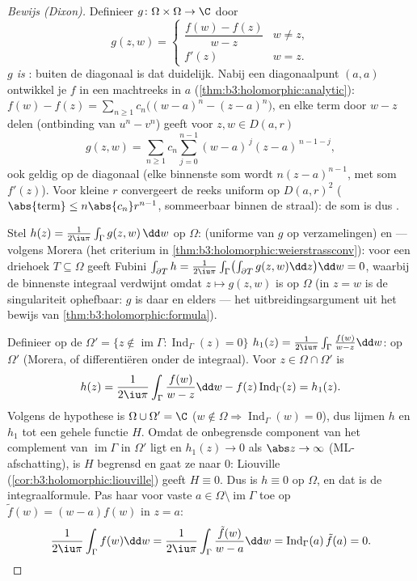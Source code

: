\begin{proof}[Bewijs (Dixon)]
Definieer $g \colon \Omega\times\Omega \to \C$ door
\[
g(z, w) = \begin{cases}
\dfrac{f(w) - f(z)}{w - z} & w \neq z,\\[4pt]
f'(z) & w = z .
\end{cases}
\]
\emph{$g$ is }: buiten de diagonaal is dat duidelijk.
Nabij een diagonaalpunt $(a, a)$ ontwikkel je $f$ in een
machtreeks in $a$ (\cref{thm:b3:holomorphic:analytic}): $f(w) -
f(z) = \sum_{n\geq1}c_n\bigl((w-a)^n - (z-a)^n\bigr)$, en elke
term door $w - z$ delen (ontbinding van $u^n - v^n$) geeft voor
$z, w \in D(a, r)$
\[
g(z, w) =
\sum_{n\geq1}c_n\sum_{j=0}^{n-1}(w-a)^{\,j}(z-a)^{\,n-1-j},
\]
ook geldig op de diagonaal (elke binnenste som wordt
$n(z-a)^{n-1}$, met som $f'(z)$). Voor kleine $r$ convergeert de
reeks uniform op $D(a,r)^2$ ($\abs{\text{term}} \leq
n\abs{c_n}r^{n-1}$, sommeerbaar binnen de straal): de som is dus
.

Stel $h(z) = \frac1{2\iu\pi}\int_\Gamma g(z, w)\,\dd w$ op
$\Omega$:  (uniforme  van $g$ op 
verzamelingen) en  --- volgens Morera (het criterium in
\cref{thm:b3:holomorphic:weierstrassconv}): voor een driehoek $T
\subseteq \Omega$ geeft Fubini $\int_{\partial T}h =
\frac1{2\iu\pi}\int_\Gamma\bigl(\int_{\partial T}g(z, w)\dd
z\bigr)\dd w = 0$, waarbij de binnenste integraal verdwijnt
omdat $z \mapsto g(z, w)$  is op $\Omega$ (in $z = w$ is
de singulariteit ophefbaar: $g$ is daar  en elders
 --- het uitbreidingsargument uit het bewijs van
\cref{thm:b3:holomorphic:formula}).

Definieer op de  $\Omega' = \{z \notin
\operatorname{im}\Gamma : \operatorname{Ind}_\Gamma(z) = 0\}$
$h_1(z) = \frac1{2\iu\pi}\int_\Gamma\frac{f(w)}{w - z}\dd w$:
 op $\Omega'$ (Morera, of differentiëren onder de
integraal). Voor $z \in \Omega\cap\Omega'$ is
\[
h(z) = \frac1{2\iu\pi}\int_\Gamma\frac{f(w)}{w-z}\dd w
- f(z)\operatorname{Ind}_\Gamma(z) = h_1(z) .
\]
Volgens de hypothese is $\Omega\cup\Omega' = \C$ ($w \notin
\Omega \Rightarrow \operatorname{Ind}_\Gamma(w) = 0$), dus lijmen
$h$ en $h_1$ tot een gehele functie $H$. Omdat de onbegrensde
component van het complement van $\operatorname{im}\Gamma$ in
$\Omega'$ ligt en $h_1(z) \to 0$ als $\abs z \to \infty$
(ML-afschatting), is $H$ begrensd en gaat ze naar $0$: Liouville
(\cref{cor:b3:holomorphic:liouville}) geeft $H \equiv 0$. Dus is
$h \equiv 0$ op $\Omega$, en dat is de integraalformule. Pas haar
voor vaste $a \in \Omega\setminus\operatorname{im}\Gamma$ toe op
$\tilde f(w) = (w - a)f(w)$ in $z = a$:
\[
\frac1{2\iu\pi}\int_\Gamma f(w)\dd w =
\frac1{2\iu\pi}\int_\Gamma \frac{\tilde f(w)}{w - a}\dd w =
\operatorname{Ind}_\Gamma(a)\,\tilde f(a) = 0 .
\]
\end{proof}

